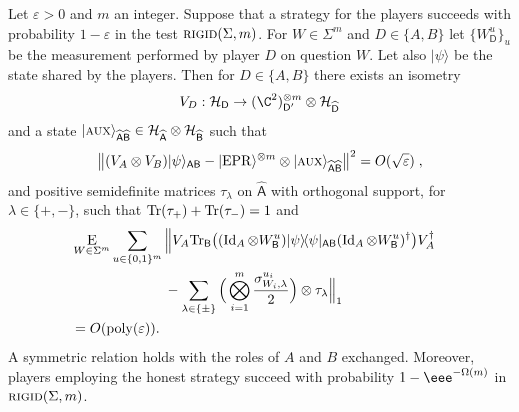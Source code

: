 \documentclass{toc}
\newcommand{\ket}[1]{|#1\rangle}
\newcommand{\bra}[1]{\langle#1|}
\newcommand{\proj}[1]{\ket{#1}\!\bra{#1}}
\newcommand{\Tr}{\mbox{\rm Tr}}
\newcommand{\Id}{\ensuremath{\mathop{\rm Id}\nolimits}}
\DeclareMathOperator{\poly}{poly}
\newcommand{\reg}[1]{{\textsf{#1}}}
\newcommand{\mH}{\mathcal{H}}
\newcommand{\eps}{\varepsilon}
\newcommand{\EPR}{{\rm EPR}}
\newcommand{\aux}{\textsc {aux}}
\newcommand{\rigid}{\textsc{rigid}}
\begin{document}
\begin{theorem}\label{thm:clifford-rigid}
Let $\eps>0$ and $m$ an integer. Suppose that a strategy for the players succeeds with probability $1-\eps$ in the test $\rigid(\Sigma,m)$. 
For $W\in\Sigma^m$ and $D\in\{A,B\}$ let $\{W^u_\reg{D}\}_u$ be the measurement performed by player $D$ on question $W$. Let also $\ket{\psi}$ be the state shared by the players.
Then for $D\in\{A,B\}$ there exists an isometry 
$$V_D: \mathcal{H}_\reg{D} \to (\C^2)^{\otimes m}_{\reg{D}'} \otimes {\mH}_{\widehat{\reg{D}}}$$
and a state  $\ket{\aux}_{\widehat{\reg{A}}\widehat{\reg{B}}} \in {\mH}_{\widehat{\reg{A}}}\otimes {\mH}_{\widehat{\reg{B}}}$
such that
\begin{equation}\label{eq:clifford-rigid-statement-1}
 \big\| (V_A \otimes V_B) \ket{\psi}_{\reg{AB}}  - \ket{\EPR}^{\otimes m} \otimes \ket{\aux}_{\widehat{\reg{A}}\widehat{\reg{B}}} \big\|^2 = O(\sqrt{\eps})\;,
\end{equation}
and positive semidefinite matrices $\tau_\lambda$ on $\widehat{\reg{A}}$ with orthogonal support, for $\lambda\in\{+,-\}$, such that $\Tr(\tau_+)+\Tr(\tau_-)=1$ and
\begin{align}
  &\mathop{\textsc{E}}_{W\in\Sigma^m} \sum_{u\in\{0,1\}^{m}} \Big\|V_A
  \Tr_{\reg{B}}\big((\Id_A \otimes W_{\reg{B}}^u) \proj{\psi}_{\reg{AB}} (\Id_A
  \otimes W_{\reg{B}}^u)^\dagger\big) V_A^\dagger \notag\\
  &\;\;\;\;\;\;\;\;\;\;\;\;\;\;\;\;\;\;\;\;\;\;\;\;- \sum_{\lambda\in\{\pm\}} \Big( \bigotimes_{i=1}^m \frac{\sigma_{W_{i},\lambda}^{u_{i}}}{2}\Big)\otimes \tau_\lambda  \Big\|_1\notag\\
  &= O(\poly(\eps)).&\label{eq:rigid-4}
\end{align}
A symmetric relation holds with the roles of $A$ and $B$ exchanged. 
Moreover, players employing the honest strategy succeed with probability
$1-\eee^{-\Omega(m)}$ in $\rigid(\Sigma,m)$.  
\end{theorem}
\end{document}
